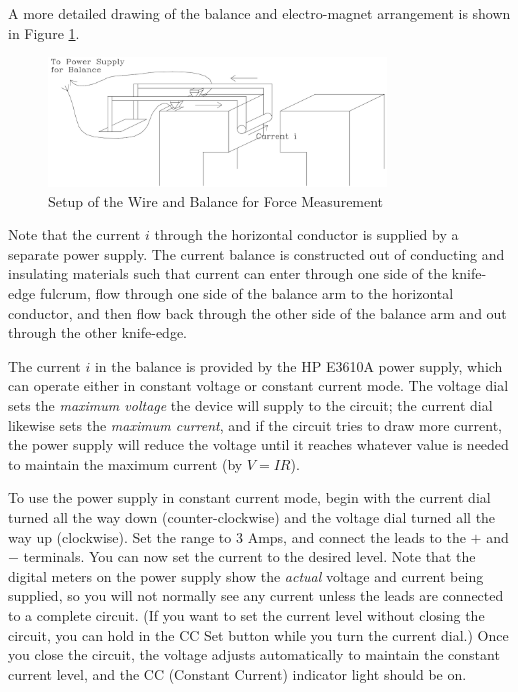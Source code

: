 A more detailed drawing of the balance and electro-magnet arrangement is shown in Figure {\ref{fig:measureforce}}.

\begin{figure}[h]
\centering
\includegraphics[width=0.8\textwidth]{./Exp4/pic/image3.png}
\caption{Setup of the Wire and Balance for Force Measurement}
\label{fig:measureforce}
\end{figure}

Note that the current $i$ through the horizontal conductor is supplied by a separate power supply. The current balance is constructed out of conducting and insulating materials such that current can enter through one side of the knife-edge fulcrum, flow through one side of the balance arm to the horizontal conductor, and then flow back through the other side of the balance arm and out through the other knife-edge. \myskip

The current $i$ in the balance is provided by the HP E3610A power supply, which can operate either in constant voltage or constant current mode. The voltage dial sets the \emph{maximum voltage} the device will supply to the circuit; the current dial likewise sets the \emph{maximum current}, and if the circuit tries to draw more current, the power supply will reduce the voltage until it reaches whatever value is needed to maintain the maximum current (by $V = IR$). \myskip

To use the power supply in constant current mode, begin with the current dial turned all the way down (counter-clockwise) and the voltage dial turned all the way up (clockwise). Set the range to 3 Amps, and connect the leads to the $+$ and $-$ terminals. You can now set the current to the desired level. Note that the digital meters on the power supply show the \emph{actual} voltage and current being supplied, so you will not normally see any current unless the leads are connected to a complete circuit. (If you want to set the current level without closing the circuit, you can hold in the CC Set button while you turn the current dial.) Once you close the circuit, the voltage adjusts automatically to maintain the constant current level, and the CC (Constant Current) indicator light should be on.

